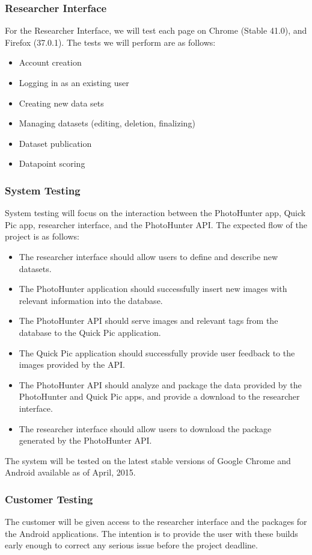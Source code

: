 \documentclass{article}
\begin{document}
\subsubsection{Researcher Interface}
For the Researcher Interface, we will test each page on Chrome (Stable 41.0), and Firefox (37.0.1). The tests we will perform are as follows:

\begin{itemize}
\item Account creation
\item Logging in as an existing user
\item Creating new data sets
\item Managing datasets (editing, deletion, finalizing)
\item Dataset publication
\item Datapoint scoring
\end{itemize}

\subsubsection{System Testing}
System testing will focus on the interaction between the PhotoHunter app, Quick Pic app, researcher interface, and the PhotoHunter API.
The expected flow of the project is as follows:
\begin{itemize}
\item The researcher interface should allow users to define and describe new datasets.
\item The PhotoHunter application should successfully insert new images with relevant information into the database.
\item The PhotoHunter API should serve images and relevant tags from the database to the Quick Pic application.
\item The Quick Pic application should successfully provide user feedback to the images provided by the API.
\item The PhotoHunter API should analyze and package the data provided by the PhotoHunter and Quick Pic apps, and provide a download to the researcher interface.
\item The researcher interface should allow users to download the package generated by the PhotoHunter API.
\end{itemize}

The system will be tested on the latest stable versions of Google Chrome and Android available as of April, 2015.

\subsubsection{Customer Testing}
The customer will be given access to the researcher interface and the packages
for the Android applications. The intention is to provide the user with these
builds early enough to correct any serious issue before the project deadline.
\end{document}
